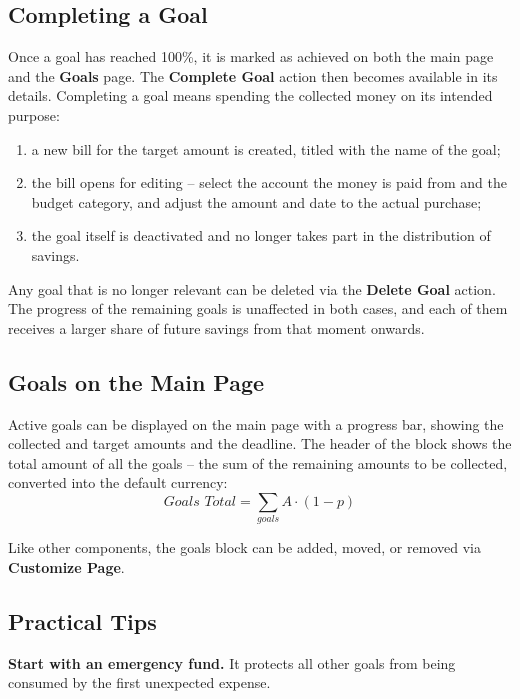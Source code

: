 \subsection{Completing a Goal}

Once a goal has reached 100\%, it is marked as achieved on both the main page and the
\textbf{Goals} page. The \textbf{Complete Goal} action then becomes available in its details.
Completing a goal means spending the collected money on its intended purpose:

\begin{enumerate}
  \item a new bill for the target amount is created, titled  with the
  name of the goal;
  \item the bill opens for editing -- select the account the money is paid from and the
  budget category, and adjust the amount and date to the actual purchase;
  \item the goal itself is deactivated and no longer takes part in the distribution of
  savings.
\end{enumerate}

\noindent  Any goal that is no longer relevant can be deleted via the \textbf{Delete Goal}
action. The progress of the remaining goals is unaffected in both cases, and each of them
receives a larger share of future savings from that moment onwards.


\subsection{Goals on the Main Page}

Active goals can be displayed on the main page with a progress bar, showing the collected and
target amounts and the deadline. The header of the block shows the total amount of all the
goals -- the sum of the remaining amounts to be collected, converted into the default
currency:
\[
  \textit{Goals Total} = \sum_{goals} A \cdot (1 - p)
\]

\noindent Like other components, the goals block can be added, moved, or removed via
\textbf{Customize Page}.


\subsection{Practical Tips}

\textbf{Start with an emergency fund.} It protects all other goals from being consumed by the
first unexpected expense.


